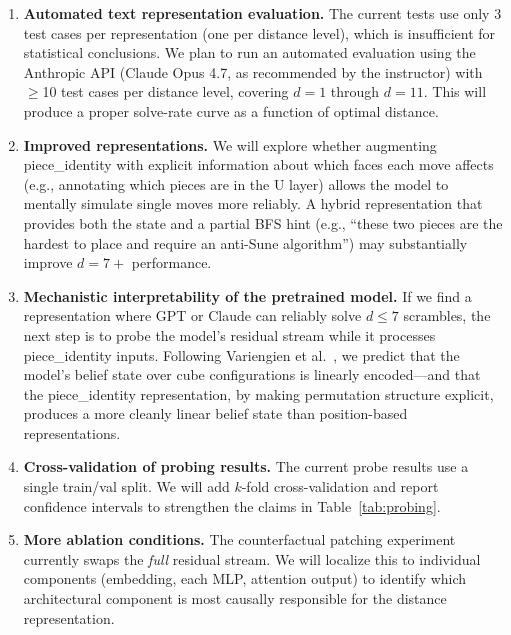 \documentclass[12pt]{article}
\begin{document}
\begin{enumerate}

  \item \textbf{Automated text representation evaluation.}  The current tests use
        only 3 test cases per representation (one per distance level), which is
        insufficient for statistical conclusions.  We plan to run an automated
        evaluation using the Anthropic API (Claude Opus 4.7, as recommended by the
        instructor) with $\geq$10 test cases per distance level, covering $d = 1$
        through $d = 11$.  This will produce a proper solve-rate curve as a
        function of optimal distance.

  \item \textbf{Improved representations.}  We will explore whether augmenting
        piece\_identity with explicit information about which faces each move
        affects (e.g., annotating which pieces are in the U layer) allows the
        model to mentally simulate single moves more reliably.  A hybrid
        representation that provides both the state and a partial BFS hint (e.g.,
        ``these two pieces are the hardest to place and require an anti-Sune
        algorithm'') may substantially improve $d{=}7+$ performance.

  \item \textbf{Mechanistic interpretability of the pretrained model.}  If we
        find a representation where GPT or Claude can reliably solve $d{\leq}7$
        scrambles, the next step is to probe the model's residual stream while it
        processes piece\_identity inputs.  Following Variengien et al.\
        \cite{variengien2024beliefstate}, we predict that the model's belief state
        over cube configurations is linearly encoded---and that the piece\_identity
        representation, by making permutation structure explicit, produces a more
        cleanly linear belief state than position-based representations.

  \item \textbf{Cross-validation of probing results.}  The current probe results
        use a single train/val split.  We will add $k$-fold cross-validation and
        report confidence intervals to strengthen the claims in
        Table~\ref{tab:probing}.

  \item \textbf{More ablation conditions.}  The counterfactual patching experiment
        currently swaps the \emph{full} residual stream.  We will localize this to
        individual components (embedding, each MLP, attention output) to identify
        which architectural component is most causally responsible for the distance
        representation.

\end{enumerate}
\end{document}
